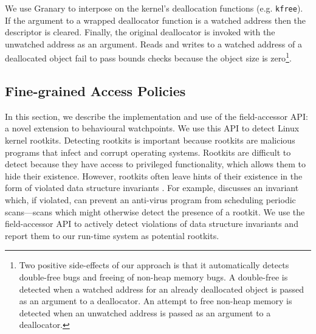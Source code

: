 \documentclass[letterpaper,twocolumn,10pt]{article}
\begin{document}
We use Granary to interpose on the kernel's deallocation functions (e.g. \texttt{kfree}). If the argument to a wrapped deallocator function is a watched address then the descriptor is cleared. Finally, the original deallocator is invoked with the unwatched address as an argument. Reads and writes to a watched address of a deallocated object fail to pass bounds checks because the object size is zero\footnote{Two positive side-effects of our approach is that it automatically detects double-free bugs and freeing of non-heap memory bugs. A double-free is detected when a watched address for an already deallocated object is passed as an argument to a deallocator. An attempt to free non-heap memory is detected when an unwatched address is passed as an argument to a deallocator.}.






\subsection{Fine-grained Access Policies\label{sec:access_policies}}
In this section, we describe the implementation and use of the field-accessor API: a novel extension to behavioural watchpoints. We use this API to detect Linux kernel rootkits. Detecting rootkits is important because rootkits are malicious programs that infect and corrupt operating systems. Rootkits are difficult to detect because they have access to  privileged functionality, which allows them to hide their existence. However, rootkits often leave hints of their existence in the form of violated data structure invariants \cite{GibraltarKernelInvariants,OSck}. For example,  discusses an invariant which, if violated, can prevent an anti-virus program from scheduling periodic scans---scans which might otherwise detect the presence of a rootkit. We use the field-accessor API to actively detect violations of data structure invariants and report them to our run-time system as potential rootkits.
\end{document}
